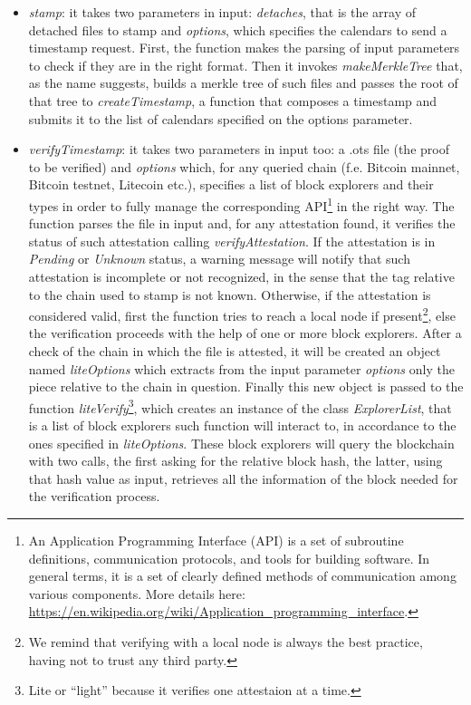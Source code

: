\begin{itemize}
    \item \textit{stamp}: it takes two parameters in input: \textit{detaches}, that is the array of detached files to stamp and \textit{options}, which specifies the calendars to send a timestamp request. First, the function makes the parsing of input parameters to check if they are in the right format. Then it invokes \textit{makeMerkleTree} that, as the name suggests, builds a merkle tree of such files and passes the root of that tree to \textit{createTimestamp}, a function that composes a timestamp and submits it to the list of calendars specified on the options parameter.
    \item \textit{verifyTimestamp}: it takes two parameters in input too: a \colorbox{light-gray}{.ots} file (the proof to be verified) and \textit{options} which, for any queried chain (f.e. Bitcoin mainnet, Bitcoin testnet, Litecoin etc.), specifies a list of block explorers and their types in order to fully manage the corresponding API\footnote{An Application Programming Interface (API) is a set of subroutine definitions, communication protocols, and tools for building software. In general terms, it is a set of clearly defined methods of communication among various components. More details here: \url{https://en.wikipedia.org/wiki/Application_programming_interface}.} in the right way. The function parses the file in input and, for any attestation found, it verifies the status of such attestation calling \textit{verifyAttestation}. If the attestation is in \textit{Pending} or \textit{Unknown} status, a warning message will notify that such attestation is incomplete or not recognized, in the sense that the tag relative to the chain used to stamp is not known. Otherwise, if the attestation is considered valid, first the function tries to reach a local node if present\footnote{We remind that verifying with a local node is always the best practice, having not to trust any third party.}, else the verification proceeds with the help of one or more block explorers. After a check of the chain in which the file is attested, it will be created an object named \textit{liteOptions} which extracts from the input parameter \textit{options} only the piece relative to the chain in question. Finally this new object is passed to the function \textit{liteVerify}\textup{\footnote{Lite or \enquote{light} because it verifies one attestaion at a time.}}, which creates an instance of the class \textit{ExplorerList}, that is a list of block explorers such function will interact to, in accordance to the ones specified in \textit{liteOptions}. These block explorers will query the blockchain with two calls, the first asking for the relative block hash, the latter, using that hash value as input, retrieves all the information of the block needed for the verification process.

\end{itemize}

